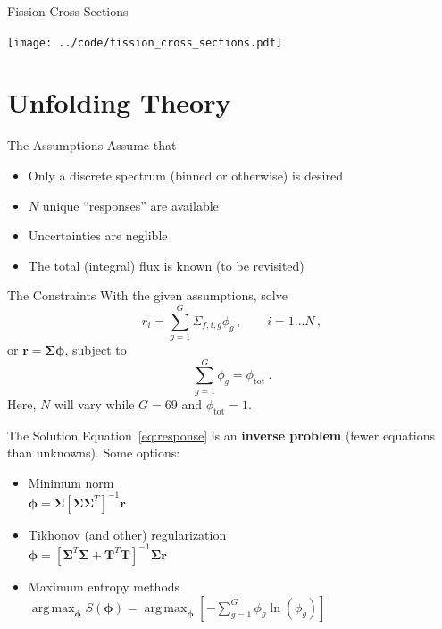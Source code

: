 \documentclass[fleqn]{beamer}
\begin{document}
    
    \begin{frame}{Fission Cross Sections}
         \begin{center}
             \texttt{[image: ../code/fission\_cross\_sections.pdf]}
         \end{center}
    \end{frame}
    
    
    \section{Unfolding Theory}
    
    \begin{frame}{The Assumptions}
      Assume that 
      \begin{itemize}
       \item Only a discrete spectrum (binned or otherwise) is desired
       \item $N$ unique ``responses'' are available
       \item Uncertainties are neglible
       \item The total (integral) flux is known (to be revisited)
      \end{itemize}
    \end{frame}  
    
    
    \begin{frame}{The Constraints}
      With the given assumptions, solve
      \begin{equation}
            r_i = \sum_{g=1}^{G} \Sigma_{f,i,g}  \phi_g\, , 
              \qquad i = 1 \ldots N \, ,
          \label{eq:response}
      \end{equation}     
      or $\mathbf{r} = \bm{\Sigma} \bm{\phi}$, subject to 
      \begin{equation}
            \sum^G_{g=1}{\phi_g} = \phi_{\textrm{tot}} \ .
      \end{equation}
      Here, $N$ will vary while $G = 69$ and $\phi_{\textrm{tot}} = 1$.
    \end{frame}

    
    \begin{frame}{The Solution}
      Equation~\ref{eq:response} is an {\bf inverse problem} (fewer equations than unknowns). 
      \vfill
      Some options: 
      \begin{itemize}
       \item Minimum norm \\
             $\bm{\phi} =  \bm{\Sigma}  [\bm{\Sigma} \bm{\Sigma}^T]^{-1}\mathbf{r}$
       \item Tikhonov (and other) regularization \\
             $\bm{\phi} = [\bm{\Sigma}^T \bm{\Sigma}+ \mathbf{T}^T \mathbf{T}]^{-1} \bm{\Sigma} \mathbf{r}$
       \item Maximum entropy methods
             $\operatorname*{arg\,max}_{\bm{\phi}} S(\bm{\phi}) = 
                \operatorname*{arg\,max}_{\bm{\phi}} \left [ -\sum^G_{g=1} \phi_g \ln(\phi_g) \right ]$
      \end{itemize}
    \end{frame}
    
\end{document}
